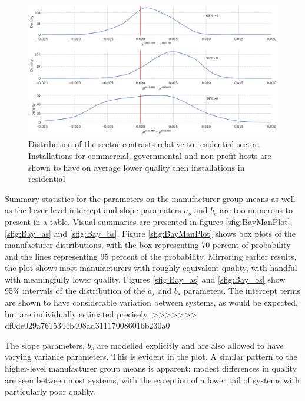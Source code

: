 \documentclass[12pt]{article}
\begin{document}
\begin{figure}
  \centering
  \includegraphics[width=.6\linewidth]{figures/mu_sectors.png}
  \caption{Distribution of the sector contrasts relative to residential sector. Installations for commercial, governmental and non-profit hosts are shown to have on average lower quality then installations in residential}
  \label{mu_sectors}
\end{figure}

Summary statistics for the parameters on the manufacturer group means as well as the lower-level intercept and slope paramaters $a_s$ and $b_s$ are too numerous to present in a table. Visual summaries are presented in figures \ref{sfig:BayManPlot}, \ref{sfig:Bay_as} and \ref{sfig:Bay_bs}. Figure \ref{sfig:BayManPlot} shows box plots of the manufacturer distributions, with the box representing 70 percent of probability and the lines representing 95 percent of the probability. Mirroring earlier results, the plot shows most manufacturers with roughly equivalent quality, with handful with meaningfully lower quality. Figures \ref{sfig:Bay_as} and \ref{sfig:Bay_bs} show 95\% intervals of the distribution of the $a_s$ and $b_s$ parameters. The intercept terms are shown to have considerable variation between systems, as would be expected, but are individually estimated precisely.
>>>>>>> df0de029a7615344b408ad311170086016b230a0

The slope parameters, $b_s$ are modelled explicitly and are also allowed to have varying variance parameters. This is evident in the plot. A similar pattern to the higher-level manufacturer group means is apparent: modest differences in quality are seen between most systems, with the exception of a lower tail of systems with particularly poor quality.
\end{document}
